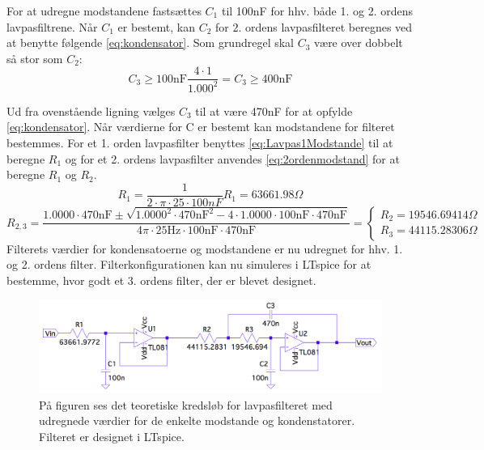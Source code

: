 \noindent For at udregne modstandene fastsættes $C_1$ til 100nF for hhv. både 1. og 2. ordens lavpasfiltrene. Når $C_1$ er bestemt, kan $C_2$ for 2. ordens lavpasfilteret beregnes ved at benytte følgende \eqref{eq:kondensator}. Som grundregel skal $C_3$ være over dobbelt så stor som $C_2$:
\begin{equation}  
C_3 \geq 100\text{nF} \frac{4\cdot 1}{1.000^2} = C_3 \geq 400\text{nF}
\end{equation}

\noindent Ud fra ovenstående ligning vælges $C_3$ til at være 470nF for at opfylde \eqref{eq:kondensator}. Når værdierne for C er bestemt kan modstandene for filteret bestemmes. For et 1. orden lavpasfilter benyttes \eqref{eq:Lavpas1Modstande} til at beregne $R_1$ og for et 2. ordens lavpasfilter anvendes \eqref{eq:2ordenmodstand} for at beregne $R_1$ og $R_2$. 
\begin{equation} \label{eq:1ordenmodstand}
R_{1} = \frac{1}{2 \cdot \pi \cdot 25 \cdot 100nF} R_{1} = 63661.98 \Omega
\end{equation}
\begin{equation} \label{eq:2ordenmodstand}
R_{2,3} = \frac{1.0000 \cdot 470\text{nF} \pm \sqrt{1.0000^2 \cdot 470\text{nF}^2 - 4 \cdot 1.0000 \cdot 100\text{nF} \cdot 470\text{nF}}}{4 \pi \cdot 25\text{Hz} \cdot 100\text{nF} \cdot 470\text{nF}} = \begin{cases} R_{2} = 19546.69414 \Omega \\ R_{3} =  44115.28306 \Omega \end{cases}
\end{equation}
\noindent Filterets værdier for kondensatoerne og modstandene er nu udregnet for hhv. 1. og 2. ordens filter. Filterkonfigurationen kan nu simuleres i LTspice for at bestemme, hvor godt et 3. ordens filter, der er blevet designet.

\begin{figure}[H]
	\centering
	\includegraphics[scale=0.3]{figures/cProblemloesning/Lavpasfilter1_LTspice.PNG}
	\caption{På figuren ses det teoretiske kredsløb for lavpasfilteret med udregnede værdier for de enkelte modstande og kondenstatorer. Filteret er designet i LTspice.}
	\label{fig:lavpasfilter1_LTspice}
\end{figure}

